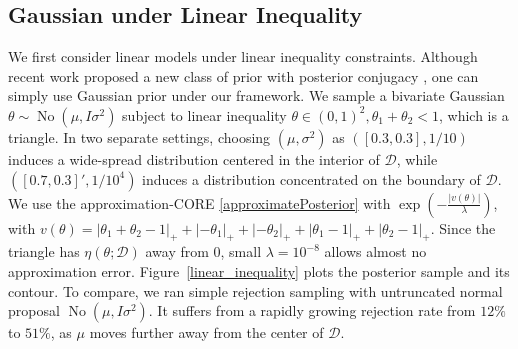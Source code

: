 \documentclass[10pt,fleqn]{article}
\newcommand{\mc}[1]{\mathcal{#1}}
\DeclareMathOperator{\No}{No}
\DeclareMathOperator{\1}{\mathbbm{1}}
\begin{document}
\subsection{Gaussian  under Linear Inequality}
We first consider linear models under linear inequality constraints. Although
recent work proposed a new class of prior with posterior conjugacy \citep{danaher2012minkowski} , one can simply use Gaussian prior under our framework. We sample a bivariate Gaussian $\theta \sim \No \left( \mu, I\sigma^2\right)$ subject to linear inequality $\theta\in(0,1)^2,\theta_1+\theta_2<1$,
which is a triangle. In two separate settings, choosing $(\mu, \sigma^2)$ as $([0.3,0.3],1/{10})$  induces a wide-spread distribution centered in the interior of $\mc D$, while $([0.7,0.3]',1/10^4)$  induces a  distribution concentrated on the boundary of $\mc D$. We use the approximation-CORE  \eqref{approximatePosterior} with $\exp(-\frac{|v(\theta)|}{\lambda})$, with $v(\theta)=|\theta_1+\theta_2-1|_+ + |-\theta_1|_+ + |-\theta_2|_ + + |\theta_1-1|_+ + |\theta_2-1|_+$.  Since the triangle has $\eta(\theta;\mc D)$ away from $0$, small $\lambda=10^{-8}$
 allows almost no approximation error. Figure~\ref{linear_inequality} plots the posterior sample and its contour. To compare, we ran simple rejection sampling with untruncated normal proposal $\No ( \mu, I\sigma^2)$. It  suffers from a rapidly growing rejection rate from $12\%$ to $51\%$, as $\mu$ moves further away from the center of $\mc D$.
\end{document}
